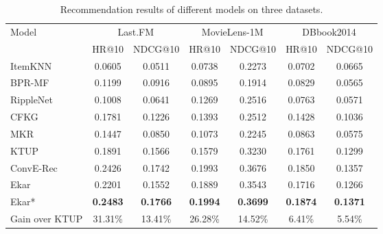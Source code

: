 \documentclass{article}
\newcommand{\name}{Ekar}
\begin{document}
\begin{table}[t!]
\centering\caption{Recommendation results of different models on three datasets.
}\label{tab::comparision}
\vspace{-3pt}
\scalebox{0.93}
{
    \begin{tabular}{lcccccc}
    \toprule
    \multirow{2}{*}{Model} & \multicolumn{2}{c}{Last.FM} & \multicolumn{2}{c}{MovieLens-1M} &  \multicolumn{2}{c}{DBbook2014} \\
    & HR@10 & NDCG@10 & HR@10 & NDCG@10 & HR@10 & NDCG@10 \\
    \midrule
ItemKNN & 0.0605 & 0.0511 & 0.0738 & 0.2273 & 0.0702 & 0.0665 \\
BPR-MF & 0.1199 & 0.0916 & 0.0895 & 0.1914 & 0.0829 & 0.0565 \\
\midrule
    RippleNet & 0.1008 & 0.0641 & 0.1269 & 0.2516 & 0.0763 & 0.0571 \\
    CFKG & 0.1781 & 0.1226 & 0.1393 & 0.2512 & 0.1428 & 0.1036 \\
    MKR & 0.1447 & 0.0850 & 0.1073 & 0.2245 & 0.0863 & 0.0575 \\
    KTUP & 0.1891 & 0.1566 & 0.1579 & 0.3230 & 0.1761 & 0.1299 \\\vspace{3pt}
    ConvE-Rec & 0.2426 & 0.1742 & 0.1993 & 0.3676 & 0.1850 & 0.1357 \\


\name & 0.2201 & 0.1552 & 0.1889 & 0.3543 & 0.1716 & 0.1266\\
    \name* & \textbf{0.2483} & \textbf{0.1766} & \textbf{0.1994} & \textbf{0.3699} & \textbf{0.1874} & \textbf{0.1371}\\
\midrule
Gain over KTUP & 31.31\% & 13.41\% & 26.28\% & 14.52\% & 6.41\% & 5.54\%\\  \bottomrule 
    \end{tabular}
}
\end{table}
\end{document}
